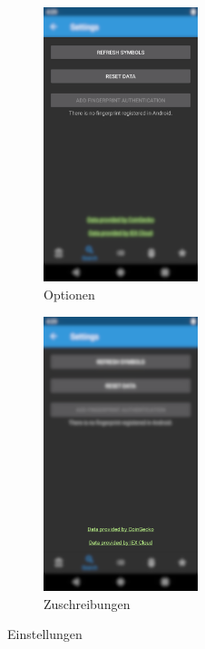 \documentclass[a4paper]{article}
\begin{document}
\begin{figure}[H]
	\begin{subfigure}{.5\textwidth}
		\centering
		\includegraphics[height=8cm,keepaspectratio]{./images/settings/buttons.png}
		\caption{Optionen}
		\label{fig:functionality:settings:buttons}
	\end{subfigure}
	\begin{subfigure}{.5\textwidth}
		\centering
		\includegraphics[height=8cm,keepaspectratio]{./images/settings/attribution.png}
		\caption{Zuschreibungen}
		\label{fig:functionality:settings:attributions}
	\end{subfigure}
	\caption{Einstellungen}
	\label{fig:functionality:settings}
\end{figure}
\end{document}
